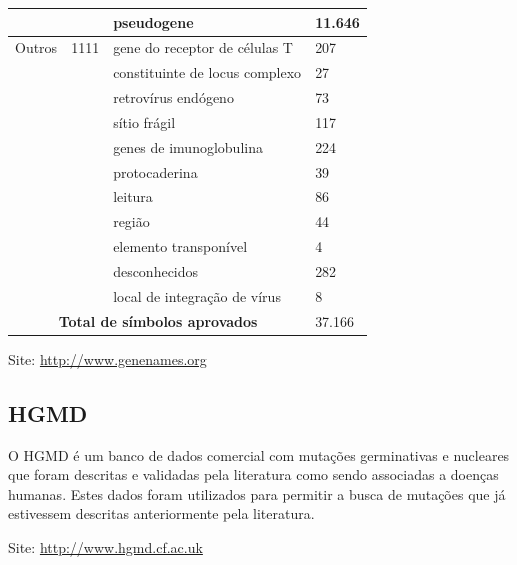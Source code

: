 {\begin{table}[p]
\begin{center}
{\begin{tabular}{|p{1.5cm}|p{3cm}|p{5cm}|p{2cm}|}
\multicolumn{ 1}{|c|}{} & \multicolumn{ 1}{l|}{} & pseudogene & 11.646 \\ \hline
\multicolumn{ 1}{|c|}{Outros} & \multicolumn{ 1}{c|}{1111} & gene do receptor de células T & 207 \\ \cline{ 3- 4}
\multicolumn{ 1}{|c|}{} & \multicolumn{ 1}{l|}{} & constituinte de locus complexo & 27 \\ \cline{ 3- 4}
\multicolumn{ 1}{|c|}{} & \multicolumn{ 1}{l|}{} & retrovírus endógeno & 73 \\ \cline{ 3- 4}
\multicolumn{ 1}{|c|}{} & \multicolumn{ 1}{l|}{} & sítio frágil & 117 \\ \cline{ 3- 4}
\multicolumn{ 1}{|c|}{} & \multicolumn{ 1}{l|}{} & genes de imunoglobulina & 224 \\ \cline{ 3- 4}
\multicolumn{ 1}{|c|}{} & \multicolumn{ 1}{l|}{} & protocaderina & 39 \\ \cline{ 3- 4}
\multicolumn{ 1}{|c|}{} & \multicolumn{ 1}{l|}{} & leitura & 86 \\ \cline{ 3- 4}
\multicolumn{ 1}{|c|}{} & \multicolumn{ 1}{l|}{} & região & 44 \\ \cline{ 3- 4}
\multicolumn{ 1}{|c|}{} & \multicolumn{ 1}{l|}{} & elemento transponível & 4 \\ \cline{ 3- 4}
\multicolumn{ 1}{|c|}{} & \multicolumn{ 1}{l|}{} & desconhecidos & 282 \\ \cline{ 3- 4}
\multicolumn{ 1}{|c|}{} & \multicolumn{ 1}{l|}{} & local de integração de vírus & 8 \\ \hline
\multicolumn{ 3}{|c|}{\textbf{Total de símbolos aprovados}} & 37.166 \\ \hline
\end{tabular}
}
\end{center}
\label{hgnc_genes}
\end{table}
\clearpage
}

Site: \url{http://www.genenames.org}

\subsection{HGMD}

O HGMD \cite{Stenson2009} é um banco de dados comercial com mutações germinativas e nucleares que foram descritas e validadas pela literatura como sendo associadas a doenças humanas. Estes dados foram utilizados para permitir a busca de mutações que já estivessem descritas anteriormente pela literatura.

Site: \url{http://www.hgmd.cf.ac.uk}

